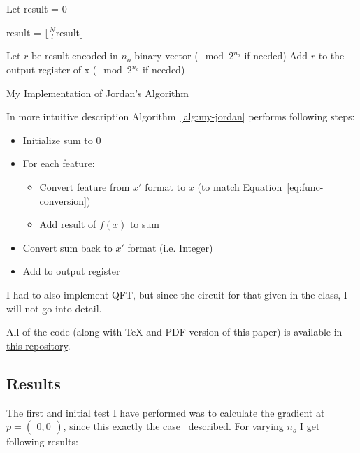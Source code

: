 \documentclass{article}
\begin{document}
\begin{algorithm}[H]
    \SetAlgoLined
    Let result = 0\;

    result = $\lfloor\frac{N}{l}$result$\rfloor$\;

    Let $r$ be result encoded in $n_o$-binary vector ($\mod 2^{n_o}$ if needed)\;
    Add $r$ to the output register of x ($\mod 2^{n_o}$ if needed)\;

    \caption{My Implementation of Jordan's Algorithm}
    \label{alg:my-jordan}
\end{algorithm}

In more intuitive description Algorithm~\ref{alg:my-jordan} performs following steps:
\begin{itemize}
    \item Initialize sum to 0
    \item For each feature:
    \begin{itemize}
        \item Convert feature from $x'$ format to $x$ (to match Equation~\ref{eq:func-conversion})
        \item Add result of $f(x)$ to sum
    \end{itemize}
    \item Convert sum back to $x'$ format (i.e. Integer)
    \item Add to output register
\end{itemize}

I had to also implement QFT, but since the circuit for that given in the class, I will not go into detail.

All of the code (along with TeX and PDF version of this paper) is available in
\href{https://github.com/balbok0/599q1-sp20/tree/master/final_project}{this repository}.

\subsection{Results}
\label{subsec:num-results}

The first and initial test I have performed was to calculate the gradient at $p = \begin{pmatrix} 0, 0 \end{pmatrix}$,
since this exactly the case~\cite{Jordan_2005} described.
For varying $n_o$ I get following results:
\end{document}
